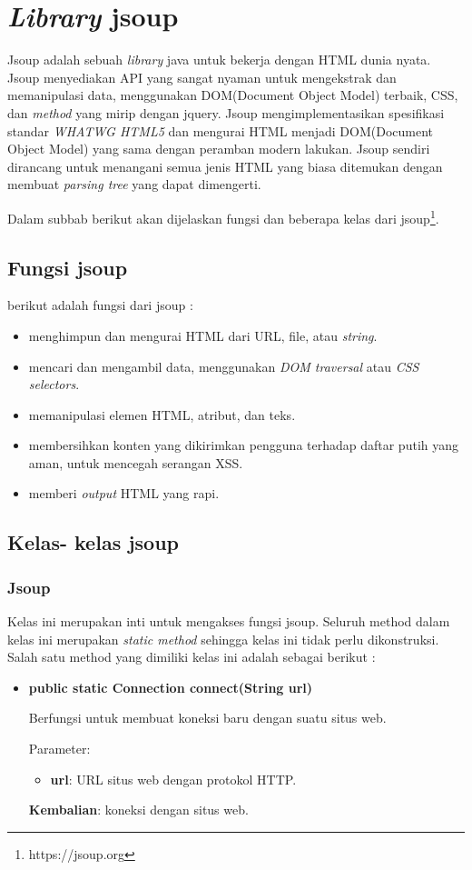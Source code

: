 \section{\textit{Library} jsoup}
\label{sec:libraryjsoup}

Jsoup adalah sebuah \textit{library} java untuk bekerja dengan HTML dunia nyata.  Jsoup menyediakan API yang sangat nyaman untuk mengekstrak dan memanipulasi data, menggunakan DOM(Document Object Model) terbaik, CSS, dan \textit{method} yang mirip dengan jquery. Jsoup mengimplementasikan spesifikasi standar \textit{WHATWG HTML5} dan mengurai HTML menjadi DOM(Document Object Model) yang sama dengan peramban modern lakukan. Jsoup sendiri dirancang untuk menangani semua jenis HTML yang biasa ditemukan dengan membuat \textit{parsing tree} yang dapat dimengerti.

Dalam subbab berikut akan dijelaskan fungsi dan beberapa kelas dari jsoup\footnote{https://jsoup.org}.
\subsection{Fungsi jsoup}
\label{subsec:fungsijsoup}
berikut adalah fungsi dari jsoup :

\begin{itemize}
	\item menghimpun dan mengurai HTML dari URL, file, atau \textsl{string}.
	\item mencari dan mengambil data, menggunakan \textit{DOM traversal} atau \textit{CSS selectors}.
	\item memanipulasi elemen HTML, atribut, dan teks.
	\item membersihkan konten yang dikirimkan pengguna terhadap daftar putih yang aman, untuk mencegah serangan XSS.
	\item memberi \textit{output} HTML yang rapi.
\end{itemize}

\subsection{Kelas- kelas jsoup}
\label{subsec:jsoupclasses}

\subsubsection{Jsoup}
\label{subsubsec:jsoup}
Kelas ini merupakan inti untuk mengakses fungsi jsoup. Seluruh method dalam kelas ini merupakan \textit{static method} sehingga kelas ini tidak perlu dikonstruksi. Salah satu method yang dimiliki kelas ini adalah sebagai berikut :
\begin{itemize}
	\item \textbf{public static Connection connect(String url)}
	
	Berfungsi untuk membuat koneksi baru dengan suatu situs web.
	
	Parameter:
	\begin{itemize}
		\item \textbf{url}: URL situs web dengan protokol HTTP.
	\end{itemize}
	\textbf{Kembalian}: koneksi dengan situs web.
\end{itemize}

